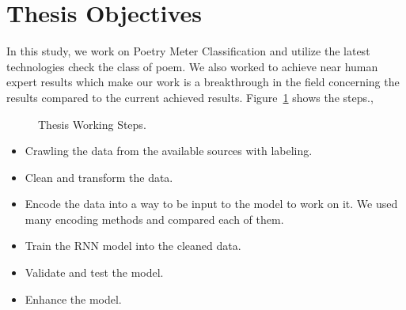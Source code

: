 \section{Thesis Objectives}
In this study, we work on Poetry Meter Classification and utilize the latest technologies check the class of poem. We also worked to achieve near human expert results which make our work is a breakthrough in the field concerning the results compared to the current achieved results. Figure~\ref{fig:Thesis_Cycle} shows the steps.,
\begin{figure}[!t]
   
  \caption{Thesis Working Steps.}
  \label{fig:Thesis_Cycle}
\end{figure}

\begin{itemize}
\item Crawling the data from the available sources with labeling.
\item Clean and transform the data.
\item Encode the data into a way to be input to the model to work on it. We used many encoding methods and compared each of them.
\item Train the RNN model into the cleaned data.
\item Validate and test the model.
\item Enhance the model.

\end{itemize}





\clearpage


%	
%	
%	



